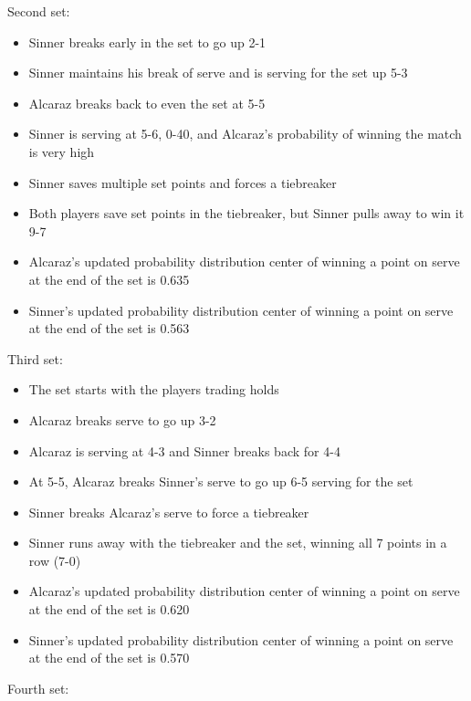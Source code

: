 \documentclass[
  letterpaper,
  DIV=11,
  numbers=noendperiod]{scrartcl}
\providecommand{\tightlist}{%
  \setlength{\itemsep}{0pt}\setlength{\parskip}{0pt}}\usepackage{longtable,booktabs,array}
\begin{document}
Second set:

\begin{itemize}
\tightlist
\item
  Sinner breaks early in the set to go up 2-1
\item
  Sinner maintains his break of serve and is serving for the set up 5-3
\item
  Alcaraz breaks back to even the set at 5-5
\item
  Sinner is serving at 5-6, 0-40, and Alcaraz's probability of winning
  the match is very high
\item
  Sinner saves multiple set points and forces a tiebreaker
\item
  Both players save set points in the tiebreaker, but Sinner pulls away
  to win it 9-7
\item
  Alcaraz's updated probability distribution center of winning a point
  on serve at the end of the set is 0.635
\item
  Sinner's updated probability distribution center of winning a point on
  serve at the end of the set is 0.563
\end{itemize}

Third set:

\begin{itemize}
\tightlist
\item
  The set starts with the players trading holds
\item
  Alcaraz breaks serve to go up 3-2
\item
  Alcaraz is serving at 4-3 and Sinner breaks back for 4-4
\item
  At 5-5, Alcaraz breaks Sinner's serve to go up 6-5 serving for the set
\item
  Sinner breaks Alcaraz's serve to force a tiebreaker
\item
  Sinner runs away with the tiebreaker and the set, winning all 7 points
  in a row (7-0)
\item
  Alcaraz's updated probability distribution center of winning a point
  on serve at the end of the set is 0.620
\item
  Sinner's updated probability distribution center of winning a point on
  serve at the end of the set is 0.570
\end{itemize}

Fourth set:
\end{document}
